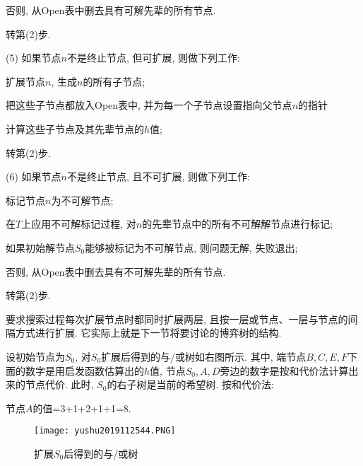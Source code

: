      否则, 从Open表中删去具有可解先辈的所有节点.

    转第(2)步.

(5) 如果节点$n$不是终止节点, 但可扩展, 则做下列工作:

    扩展节点$n$, 生成$n$的所有子节点;

     把这些子节点都放入Open表中, 并为每一个子节点设置指向父节点$n$的指针

    计算这些子节点及其先辈节点的$h$值;

     转第(2)步.

(6) 如果节点$n$不是终止节点, 且不可扩展, 则做下列工作:

    标记节点$n$为不可解节点;

     在$T$上应用不可解标记过程, 对$n$的先辈节点中的所有不可解解节点进行标记;

     如果初始解节点$S_0$能够被标记为不可解节点, 则问题无解, 失败退出;

    否则, 从Open表中删去具有不可解先辈的所有节点.

     转第(2)步.


\begin{remark}
    要求搜索过程每次扩展节点时都同时扩展两层, 且按一层或节点、一层与节点的间隔方式进行扩展. 它实际上就是下一节将要讨论的博弈树的结构.
\end{remark}

设初始节点为$S_0$, 对$S_0$扩展后得到的与/或树如右图所示. 其中, 端节点$B,C,E,F$下面的数字是用启发函数估算出的$h$值, 节点$S_0,A,D$旁边的数字是按和代价法计算出来的节点代价.
此时, $S_0$的右子树是当前的希望树. 按和代价法:
\begin{example}
    节点$A$的值=3+1+2+1+1=8.
\begin{figure}[H]
  \centering
  \texttt{[image: yushu2019112544.PNG]}
  \caption{扩展$S_0$后得到的与/或树}
  \label{AI32fig44}
\end{figure}
\end{example}


